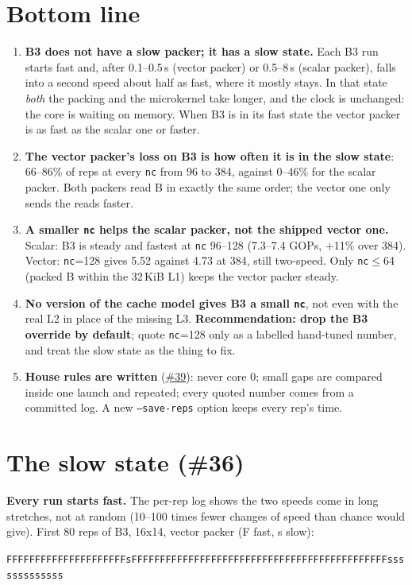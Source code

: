 \documentclass[10pt,a4paper]{article}
\newcommand{\iss}[1]{\href{https://github.com/JieGH/RVV_code_gen_via_MLIR_xDSL/issues/#1}{\##1}}
\begin{document}
\section{Bottom line}
\begin{enumerate}
  \item \textbf{B3 does not have a slow packer; it has a slow state.} Each B3 run starts fast and, after
  0.1--0.5\,s (vector packer) or 0.5--8\,s (scalar packer), falls into a second speed about half as fast, where it
  mostly stays. In that state \emph{both} the packing and the microkernel take longer, and the clock is unchanged:
  the core is waiting on memory. When B3 is in its fast state the vector packer is as fast as the scalar one or faster.
  \item \textbf{The vector packer's loss on B3 is how often it is in the slow state}: 66--86\% of reps at every
  \texttt{nc} from 96 to 384, against 0--46\% for the scalar packer. Both packers read B in exactly the same order;
  the vector one only sends the reads faster.
  \item \textbf{A smaller \texttt{nc} helps the scalar packer, not the shipped vector one.} Scalar: B3 is steady
  and fastest at \texttt{nc} 96--128 (7.3--7.4 GOPs, $+$11\% over 384). Vector: \texttt{nc}=128 gives 5.52 against
  4.73 at 384, still two-speed. Only \texttt{nc}$\le$64 (packed B within the 32\,KiB L1) keeps the vector packer steady.
  \item \textbf{No version of the cache model gives B3 a small \texttt{nc}}, not even with the real L2 in place of the
  missing L3. \textbf{Recommendation: drop the B3 override by default}; quote \texttt{nc}=128 only as a labelled
  hand-tuned number, and treat the slow state as the thing to fix.
  \item \textbf{House rules are written} (\iss{39}): never core 0; small gaps are compared inside one launch and
  repeated; every quoted number comes from a committed log. A new \texttt{--save-reps} option keeps every rep's time.
\end{enumerate}

\section{The slow state (\#36)}
\textbf{Every run starts fast.} The per-rep log shows the two speeds come in long stretches, not at random
(10--100 times fewer changes of speed than chance would give). First 80 reps of B3, 16x14, vector packer (F fast, s slow):
\begin{center}\small\texttt{FFFFFFFFFFFFFFFFFFFFFsFFFFFFFFFFFFFFFFFFFFFFFFFFFFFFFFFFFFFFFFFFFFFsssssssssssss}\end{center}
\end{document}
